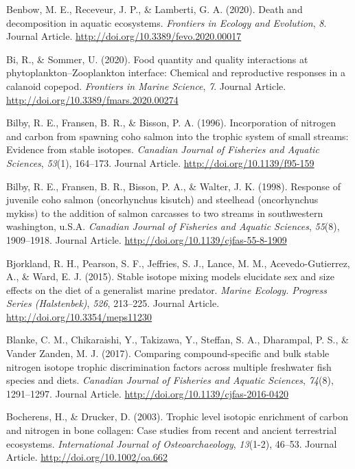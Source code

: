 \documentclass [11pt, proquest] {uwthesis}[2015/03/03]
\begin{document}
\hypertarget{ref-Benbow2020}{}
Benbow, M. E., Receveur, J. P., \& Lamberti, G. A. (2020). Death and
decomposition in aquatic ecosystems. \emph{Frontiers in Ecology and
Evolution}, \emph{8}. Journal Article.
\url{http://doi.org/10.3389/fevo.2020.00017}

\hypertarget{ref-Bi2020}{}
Bi, R., \& Sommer, U. (2020). Food quantity and quality interactions at
phytoplankton--Zooplankton interface: Chemical and reproductive
responses in a calanoid copepod. \emph{Frontiers in Marine Science},
\emph{7}. Journal Article. \url{http://doi.org/10.3389/fmars.2020.00274}

\hypertarget{ref-Bilby1996}{}
Bilby, R. E., Fransen, B. R., \& Bisson, P. A. (1996). Incorporation of
nitrogen and carbon from spawning coho salmon into the trophic system of
small streams: Evidence from stable isotopes. \emph{Canadian Journal of
Fisheries and Aquatic Sciences}, \emph{53}(1), 164--173. Journal
Article. \url{http://doi.org/10.1139/f95-159}

\hypertarget{ref-Bilby1998}{}
Bilby, R. E., Fransen, B. R., Bisson, P. A., \& Walter, J. K. (1998).
Response of juvenile coho salmon (oncorhynchus kisutch) and steelhead
(oncorhynchus mykiss) to the addition of salmon carcasses to two streams
in southwestern washington, u.S.A. \emph{Canadian Journal of Fisheries
and Aquatic Sciences}, \emph{55}(8), 1909--1918. Journal Article.
\url{http://doi.org/10.1139/cjfas-55-8-1909}

\hypertarget{ref-Bjorkland2015}{}
Bjorkland, R. H., Pearson, S. F., Jeffries, S. J., Lance, M. M.,
Acevedo-Gutierrez, A., \& Ward, E. J. (2015). Stable isotope mixing
models elucidate sex and size effects on the diet of a generalist marine
predator. \emph{Marine Ecology. Progress Series (Halstenbek)},
\emph{526}, 213--225. Journal Article.
\url{http://doi.org/10.3354/meps11230}

\hypertarget{ref-Blanke2017}{}
Blanke, C. M., Chikaraishi, Y., Takizawa, Y., Steffan, S. A., Dharampal,
P. S., \& Vander Zanden, M. J. (2017). Comparing compound-specific and
bulk stable nitrogen isotope trophic discrimination factors across
multiple freshwater fish species and diets. \emph{Canadian Journal of
Fisheries and Aquatic Sciences}, \emph{74}(8), 1291--1297. Journal
Article. \url{http://doi.org/10.1139/cjfas-2016-0420}

\hypertarget{ref-Bocherens2003}{}
Bocherens, H., \& Drucker, D. (2003). Trophic level isotopic enrichment
of carbon and nitrogen in bone collagen: Case studies from recent and
ancient terrestrial ecosystems. \emph{International Journal of
Osteoarchaeology}, \emph{13}(1-2), 46--53. Journal Article.
\url{http://doi.org/10.1002/oa.662}
\end{document}
